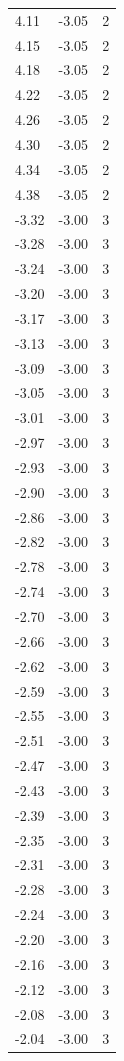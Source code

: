 \begin{longtable}{lrr}
  4.11 & -3.05 & 2 \\
  4.15 & -3.05 & 2 \\
  4.18 & -3.05 & 2 \\
  4.22 & -3.05 & 2 \\
  4.26 & -3.05 & 2 \\
  4.30 & -3.05 & 2 \\
  4.34 & -3.05 & 2 \\
  4.38 & -3.05 & 2 \\
  -3.32 & -3.00 & 3 \\
  -3.28 & -3.00 & 3 \\
  -3.24 & -3.00 & 3 \\
  -3.20 & -3.00 & 3 \\
  -3.17 & -3.00 & 3 \\
  -3.13 & -3.00 & 3 \\
  -3.09 & -3.00 & 3 \\
  -3.05 & -3.00 & 3 \\
  -3.01 & -3.00 & 3 \\
  -2.97 & -3.00 & 3 \\
  -2.93 & -3.00 & 3 \\
  -2.90 & -3.00 & 3 \\
  -2.86 & -3.00 & 3 \\
  -2.82 & -3.00 & 3 \\
  -2.78 & -3.00 & 3 \\
  -2.74 & -3.00 & 3 \\
  -2.70 & -3.00 & 3 \\
  -2.66 & -3.00 & 3 \\
  -2.62 & -3.00 & 3 \\
  -2.59 & -3.00 & 3 \\
  -2.55 & -3.00 & 3 \\
  -2.51 & -3.00 & 3 \\
  -2.47 & -3.00 & 3 \\
  -2.43 & -3.00 & 3 \\
  -2.39 & -3.00 & 3 \\
  -2.35 & -3.00 & 3 \\
  -2.31 & -3.00 & 3 \\
  -2.28 & -3.00 & 3 \\
  -2.24 & -3.00 & 3 \\
  -2.20 & -3.00 & 3 \\
  -2.16 & -3.00 & 3 \\
  -2.12 & -3.00 & 3 \\
  -2.08 & -3.00 & 3 \\
  -2.04 & -3.00 & 3 \\

\end{longtable}
